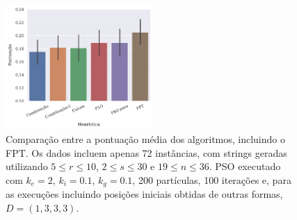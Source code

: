         \begin{figure}[htb]
            \centering
            \includegraphics[width=0.5\textwidth]{images/fpt.pdf}
            \caption{Comparação entre a pontuação média dos algoritmos, incluindo o FPT. Os dados incluem apenas 72 instâncias, com strings geradas utilizando $5 \leq r \leq 10$, $2 \leq s \leq 30$ e $19 \leq n \leq 36$. PSO executado com $k_e = 2$, $k_i = 0.1$, $k_g = 0.1$, 200 partículas, 100 iterações e, para as execuções incluindo posições iniciais obtidas de outras formas, $D = (1, 3, 3, 3)$.}
            \label{fig:fpt}
        \end{figure}
